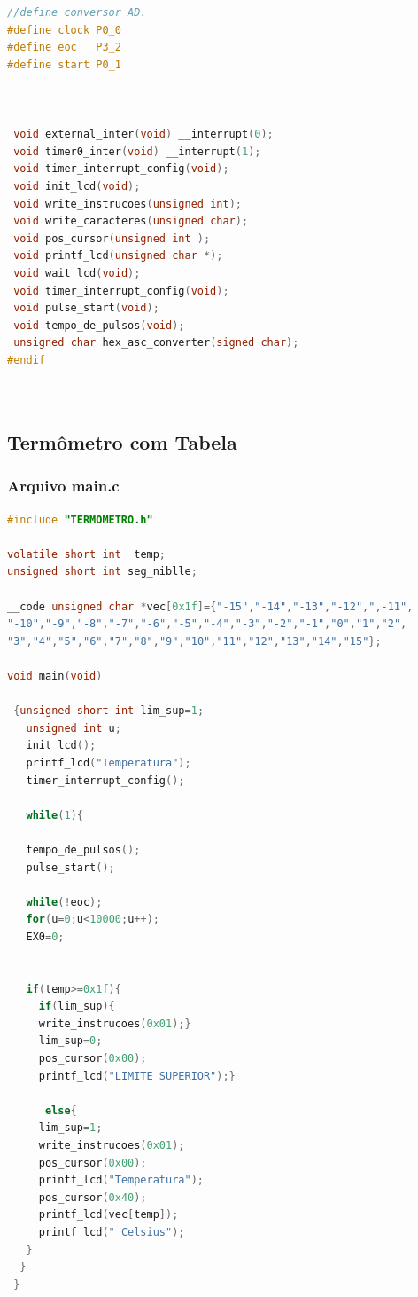 \documentclass{Fabiano_file}
\begin{document}
{\begin{lstlisting}[language=C]
//define conversor AD.
#define clock P0_0
#define eoc   P3_2
#define start P0_1



 void external_inter(void) __interrupt(0);
 void timer0_inter(void) __interrupt(1);
 void timer_interrupt_config(void);
 void init_lcd(void);
 void write_instrucoes(unsigned int);
 void write_caracteres(unsigned char);
 void pos_cursor(unsigned int );
 void printf_lcd(unsigned char *);
 void wait_lcd(void);
 void timer_interrupt_config(void);
 void pulse_start(void);
 void tempo_de_pulsos(void);
 unsigned char hex_asc_converter(signed char);
#endif

    

\end{lstlisting}

\newpage

\subsection{Termômetro com Tabela}

\subsubsection{Arquivo main.c}
\begin{lstlisting}[language=C]
#include "TERMOMETRO.h"

volatile short int  temp; 
unsigned short int seg_niblle;

__code unsigned char *vec[0x1f]={"-15","-14","-13","-12",",-11",
"-10","-9","-8","-7","-6","-5","-4","-3","-2","-1","0","1","2",
"3","4","5","6","7","8","9","10","11","12","13","14","15"};

void main(void)

 {unsigned short int lim_sup=1;    
   unsigned int u;
   init_lcd();
   printf_lcd("Temperatura");
   timer_interrupt_config();
    
   while(1){

   tempo_de_pulsos();
   pulse_start();

   while(!eoc);
   for(u=0;u<10000;u++);
   EX0=0;
 
  
   if(temp>=0x1f){
	 if(lim_sup){
	 write_instrucoes(0x01);}
	 lim_sup=0;
	 pos_cursor(0x00);
	 printf_lcd("LIMITE SUPERIOR");}
      
      else{
	 lim_sup=1;
	 write_instrucoes(0x01);
	 pos_cursor(0x00);
	 printf_lcd("Temperatura");
	 pos_cursor(0x40);
	 printf_lcd(vec[temp]);
	 printf_lcd(" Celsius");
   }
  }
 }
	     	       

\end{lstlisting}}
\end{document}
